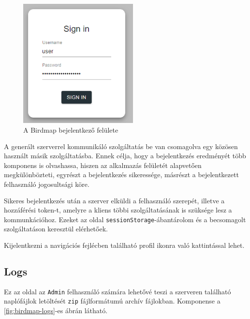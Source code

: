\begin{figure}[!ht]
    \centering
    \includegraphics[width=60mm, keepaspectratio]{figures/birdmap-login.png}
    \caption{A Birdmap bejelentkező felülete}
    \label{fig:birdmap-login}
\end{figure}

A generált szerverrel kommunikáló szolgáltatás be van csomagolva egy közösen használt másik szolgáltatásba.
Ennek célja, hogy a bejelentkezés eredményét több komponens is olvashassa, hiszen az alkalmazás felületét alapvetően megkülönbözteti,
egyrészt a bejelentkezés sikeressége, másrészt a bejelentkezett felhasználó jogosultsági köre.

Sikeres bejelentkezés után a szerver elküldi a felhasználó szerepét, illetve a hozzáférési token-t, amelyre a kliens többi szolgáltatásának is szüksége lesz a kommunkációhoz. 
Ezeket az oldal \verb+sessionStorage+-ában\footnotemark tárolom és a becsomagolt szolgáltatáson keresztül elérhetőek.

Kijelentkezni a navigációs fejlécben található profil ikonra való kattintással lehet.


\subsection{Logs}
Ez az oldal az \verb+Admin+ felhasználó számára lehetővé teszi a szerveren található naplófájlok letöltését \verb+zip+ fájlformátumú archív fájlokban.
Komponense a \ref{fig:birdmap-logs}-es ábrán látható.

